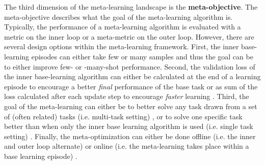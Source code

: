 The third dimension of the meta-learning landscape is the \textbf{meta-objective}.
The meta-objective describes what the goal of the meta-learning algorithm is.
Typically, the performance of a meta-learning algorithm is evaluated with a metric on the inner loop or a meta-metric on the outer loop.
However, there are several design options within the meta-learning framework.
First, the inner base-learning episodes can either take few \cite{ravi2016optimization, 10-5555-3305381-3305498} or many \cite{10-5555-3305381-3305502, 10-5555-3305890-3306069} samples and thus the goal can be to either improve few- or -many-shot performance.
Second, the validation loss of the inner base-learning algorithm can either be calculated at the end of a learning episode to encourage a better \emph{final} performance of the base task or as sum of the loss calculated after each update step to encourage \emph{faster} learning \cite{antoniou2018how}.
Third, the goal of the meta-learning can either be to better solve any task drawn from a set of (often related) tasks (i.e. multi-task setting) \cite{10-5555-3305381-3305498, 10-5555-3294996-3295163, li2019feature}, or to solve one specific task better than when only the inner base learning algorithm is used (i.e. single task setting) \cite{10-5555-3305381-3305502}.
Finally, the meta-optimization can either be done offline (i.e. the inner and outer loop alternate) \cite{10-5555-3305381-3305498} or online (i.e. the meta-learning takes place within a base learning episode) \cite{li2019feature}.





